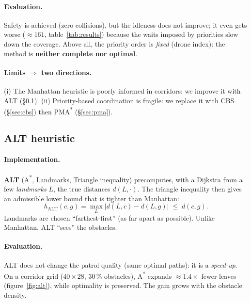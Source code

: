 \documentclass[11pt,a4paper]{article}
\begin{document}
\paragraph{Evaluation.} Safety is achieved (zero collisions), but the idleness
does not improve; it even gets worse ($\approx 161$, table~\ref{tab:results})
because the waits imposed by priorities slow down the coverage. Above all, the
priority order is \emph{fixed} (drone index): the method is \textbf{neither
complete nor optimal}.

\paragraph{Limits $\Rightarrow$ two directions.} (i) The Manhattan heuristic is
poorly informed in corridors: we improve it with ALT (§\ref{sec:alt}). (ii)
Priority-based coordination is fragile: we replace it with CBS (§\ref{sec:cbs})
then PMA\textsuperscript{*} (§\ref{sec:pma}).

\subsection{ALT heuristic}
\label{sec:alt}

\paragraph{Implementation.} \textbf{ALT} (A\textsuperscript{*}, Landmarks,
Triangle inequality) precomputes, with a Dijkstra from a few \emph{landmarks}
$L$, the true distances $d(L,\cdot)$. The triangle inequality then gives an
admissible lower bound that is tighter than Manhattan:
\begin{equation}
  h_{\mathrm{ALT}}(c,g) = \max_{L} \bigl| d(L,c) - d(L,g) \bigr| \;\le\; d(c,g).
  \label{eq:alt}
\end{equation}
Landmarks are chosen ``farthest-first'' (as far apart as possible). Unlike
Manhattan, ALT ``sees'' the obstacles.

\paragraph{Evaluation.} ALT does not change the patrol quality (same optimal
paths): it is a \emph{speed-up}. On a corridor grid ($40\times28$, $30\,\%$
obstacles), A\textsuperscript{*} expands $\approx 1.4\times$ fewer leaves
(figure~\ref{fig:alt}), while optimality is preserved. The gain grows with the
obstacle density.
\end{document}

